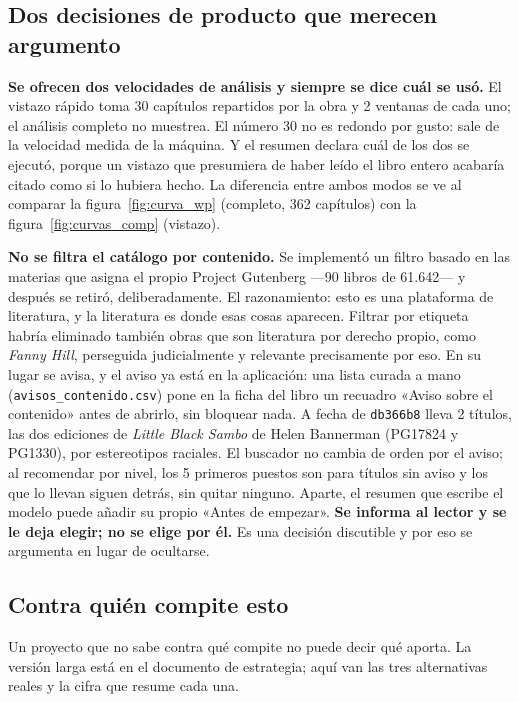 \documentclass[11pt,a4paper]{article}
\newcommand{\cod}[1]{\texttt{\small #1}}
\begin{document}
\subsection{Dos decisiones de producto que merecen argumento}
\label{sec:producto}

\textbf{Se ofrecen dos velocidades de análisis y siempre se dice cuál se usó.} El vistazo
rápido toma 30 capítulos repartidos por la obra y 2 ventanas de cada uno; el análisis
completo no muestrea. El número 30 no es redondo por gusto: sale de la velocidad medida de
la máquina. Y el resumen declara cuál de los dos se ejecutó, porque un vistazo que
presumiera de haber leído el libro entero acabaría citado como si lo hubiera hecho. La
diferencia entre ambos modos se ve al comparar la figura~\ref{fig:curva_wp} (completo, 362
capítulos) con la figura~\ref{fig:curvas_comp} (vistazo).

\textbf{No se filtra el catálogo por contenido.} Se implementó un filtro basado en las
materias que asigna el propio Project Gutenberg —90 libros de 61.642— y después se retiró,
deliberadamente. El razonamiento: esto es una plataforma de literatura, y la literatura es
donde esas cosas aparecen. Filtrar por etiqueta habría eliminado también obras que son
literatura por derecho propio, como \emph{Fanny Hill}, perseguida judicialmente y
relevante precisamente por eso. En su lugar se avisa, y el aviso ya está en la
aplicación: una lista curada a mano (\cod{avisos\_contenido.csv}) pone en la ficha del
libro un recuadro «Aviso sobre el contenido» antes de abrirlo, sin bloquear nada. A
fecha de \cod{db366b8} lleva 2 títulos, las dos ediciones de \emph{Little Black Sambo}
de Helen Bannerman (PG17824 y PG1330), por estereotipos raciales. El buscador no
cambia de orden por el aviso; al recomendar por nivel, los 5 primeros puestos son
para títulos sin aviso y los que lo llevan siguen detrás, sin quitar ninguno. Aparte,
el resumen que escribe el modelo puede añadir su propio «Antes de empezar». \textbf{Se
informa al lector y se le deja elegir; no se elige por él.} Es una decisión discutible y
por eso se argumenta en lugar de ocultarse.

\subsection{Contra quién compite esto}
\label{sec:competencia}

Un proyecto que no sabe contra qué compite no puede decir qué aporta. La versión larga
está en el documento de estrategia; aquí van las tres alternativas reales y la cifra que
resume cada una.
\end{document}
